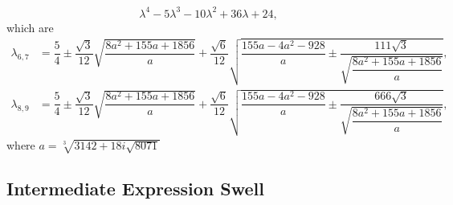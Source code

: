 \begin{example}
  \begin{equation*}
    \lambda^4 - 5\lambda^3 - 10\lambda^2 + 36\lambda + 24,
  \end{equation*}
  which are
  \begin{equation*}
    \begin{aligned}
      \lambda_{6,7} &= \dfrac{5}{4} \pm \dfrac{\sqrt{3}}{12}\sqrt{{\dfrac{8a^{2}+155a+1856}{a}}} + \dfrac{\sqrt{6}}{12}\sqrt{{\dfrac{155a-4a^{2}-928}{a}} \pm {\dfrac{111\sqrt{3}}{\sqrt{{\dfrac{8a^{2}+155a+1856}{a}}}}}}, \\[0.2em]
      \lambda_{8,9} &= \dfrac{5}{4} \pm \dfrac{\sqrt{3}}{12}\sqrt{{\dfrac{8a^{2}+155a+1856}{a}}} + \dfrac{\sqrt{6}}{12}\sqrt{{\dfrac{155a-4a^{2}-928}{a}} \pm {\dfrac{666\sqrt{3}}{\sqrt{{\dfrac{8a^{2}+155a+1856}{a}}}}}},
    \end{aligned}
  \end{equation*}
  where $a = \sqrt[3]{3142+18i\sqrt{8071}}$
\end{example}

\subsection{Intermediate Expression Swell}


